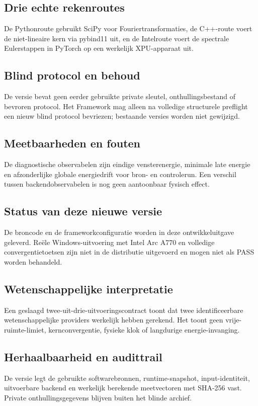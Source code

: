 \documentclass[10pt,a4paper]{article}
\begin{document}
\subsection{Drie echte rekenroutes}
De Pythonroute gebruikt SciPy voor Fouriertransformaties, de C++-route voert de niet-lineaire kern via pybind11 uit, en de Intelroute voert de spectrale Eulerstappen in PyTorch op een werkelijk XPU-apparaat uit.
\subsection{Blind protocol en behoud}
De versie bevat geen eerder gebruikte private sleutel, onthullingsbestand of bevroren protocol. Het Framework mag alleen na volledige structurele preflight een nieuw blind protocol bevriezen; bestaande versies worden niet gewijzigd.
\subsection{Meetbaarheden en fouten}
De diagnostische observabelen zijn eindige vensterenergie, minimale late energie en afzonderlijke globale energiedrift voor bron- en controlerun. Een verschil tussen backendobservabelen is nog geen aantoonbaar fysisch effect.
\subsection{Status van deze nieuwe versie}
De broncode en de frameworkconfiguratie worden in deze ontwikkeluitgave geleverd. Reële Windows-uitvoering met Intel Arc A770 en volledige convergentietoetsen zijn niet in de distributie uitgevoerd en mogen niet als PASS worden behandeld.
\subsection{Wetenschappelijke interpretatie}
Een geslaagd twee-uit-drie-uitvoeringscontract toont dat twee identificeerbare wetenschappelijke providers werkelijk hebben gerekend. Het toont geen vrije-ruimte-limiet, kernconvergentie, fysieke klok of langdurige energie-invanging.
\subsection{Herhaalbaarheid en audittrail}
De versie legt de gebruikte softwarebronnen, runtime-snapshot, input-identiteit, uitvoerbare backend en werkelijk berekende meetvectoren met SHA-256 vast. Private onthullingsgegevens blijven buiten het blinde archief.
\end{document}
